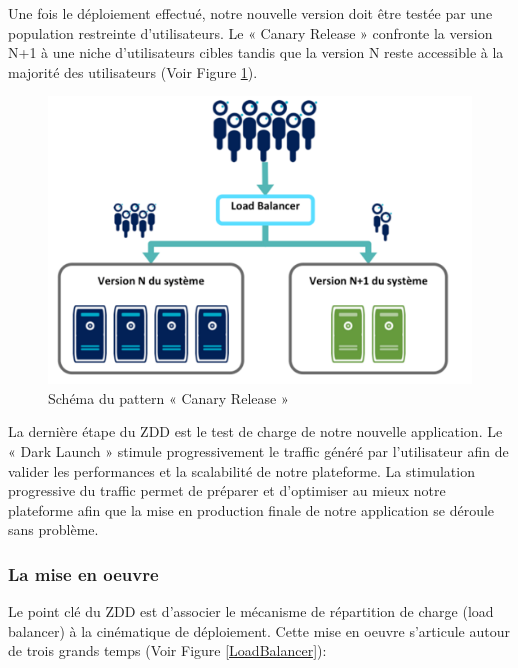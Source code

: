         Une fois le déploiement effectué, notre nouvelle version doit être testée par une population restreinte d’utilisateurs. Le « Canary Release » confronte la version N+1 à une niche d’utilisateurs cibles tandis que la version N reste accessible à la majorité des utilisateurs (Voir Figure \ref{CanaryRelease}).\\

        \begin{figure}
          \begin{center}
            \includegraphics[scale=0.6]{images/CanaryRelease.png}
          \end{center}
          \caption{Schéma du pattern « Canary Release »}
          \label{CanaryRelease}
        \end{figure}

        La dernière étape du ZDD est le test de charge de notre nouvelle application. Le « Dark Launch » stimule progressivement le traffic généré par l’utilisateur afin de valider les performances et la scalabilité de notre plateforme. La stimulation progressive du traffic permet de préparer et d’optimiser au mieux notre plateforme afin que la mise en production finale de notre application se déroule sans problème.

        \subsubsection{La mise en oeuvre}
        Le point clé du ZDD est d'associer le mécanisme de répartition de charge (\gls{load balancer}) à la cinématique de déploiement. Cette mise en oeuvre s'articule autour de trois grands temps (Voir Figure \ref{LoadBalancer}):\\

